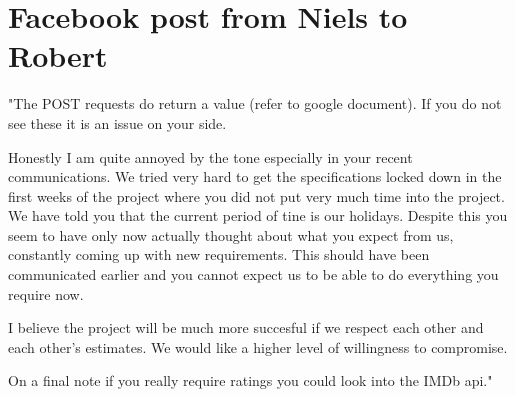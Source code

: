 \section{Facebook post from Niels to Robert}
\label{app:enough}
"The POST requests do return a value (refer to google document). If you do not
see these it is an issue on your side.

Honestly I am quite annoyed by the tone especially in your recent
communications. We tried very hard to get the specifications locked down in the
first weeks of the project where you did not put very much time into the
project. We have told you that the current period of tine is our holidays.
Despite this you seem to have only now actually thought about what you expect
from us, constantly coming up with new requirements. This should have been
communicated earlier and you cannot expect us to be able to do everything you
require now.

I believe the project will be much more succesful if we respect each other and
each other's estimates. We would like a higher level of willingness to
compromise.

On a final note if you really require ratings you could look into the IMDb api."
